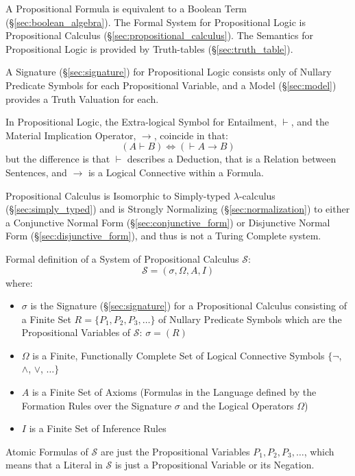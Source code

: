 A Propositional Formula is equivalent to a Boolean Term
(\S\ref{sec:boolean_algebra}). The Formal System for Propositional
Logic is Propositional Calculus (\S\ref{sec:propositional_calculus}).
The Semantics for Propositional Logic is provided by Truth-tables
(\S\ref{sec:truth_table}).

A Signature (\S\ref{sec:signature}) for Propositional Logic consists
only of Nullary Predicate Symbols for each Propositional Variable, and
a Model (\S\ref{sec:model}) provides a Truth Valuation for each.

In Propositional Logic, the Extra-logical Symbol for Entailment,
$\vdash$, and the Material Implication Operator, $\rightarrow$,
coincide in that:
\[
  (A \vdash B) \Leftrightarrow (\vdash A \rightarrow B)
\]
but the difference is that $\vdash$ describes a Deduction, that is a
Relation between Sentences, and $\rightarrow$ is a Logical Connective
within a Formula.

Propositional Calculus is Isomorphic to Simply-typed
$\lambda$-calculus (\S\ref{sec:simply_typed}) and is Strongly
Normalizing (\S\ref{sec:normalization}) to either a Conjunctive Normal
Form (\S\ref{sec:conjunctive_form}) or Disjunctive Normal Form
(\S\ref{sec:disjunctive_form}), and thus is not a Turing Complete
system.

Formal definition of a System of Propositional Calculus $\mathcal{S}$:
\[
    \mathcal{S} = (\sigma, \Omega, A, I)
\]
where:
\begin{itemize}
  \item $\sigma$ is the Signature (\S\ref{sec:signature}) for a
    Propositional Calculus consisting of a Finite Set $R = \{P_1, P_2,
    P_3, \ldots\}$ of Nullary Predicate Symbols which are the
    Propositional Variables of $\mathcal{S}$: $\sigma = (R)$
  \item $\Omega$ is a Finite, Functionally Complete Set of Logical
    Connective Symbols $\{\neg$, $\wedge$, $\vee$, $\ldots\}$
  \item $A$ is a Finite Set of Axioms (Formulas in the Language defined
    by the Formation Rules over the Signature $\sigma$ and the Logical
    Operators $\Omega$)
  \item $I$ is a Finite Set of Inference Rules
\end{itemize}
Atomic Formulas of $\mathcal{S}$ are just the Propositional Variables
$P_1, P_2, P_3, \ldots$, which means that a Literal in $\mathcal{S}$
is just a Propositional Variable or its Negation.

